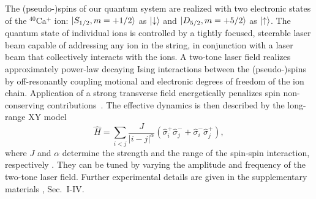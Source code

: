 \documentclass[aps,10pt,reprint,groupedaddress,superscriptaddress]{revtex4-2}
\begin{document}
The (pseudo-)spins of our quantum system are realized with two electronic states of the $^{40}$Ca$^+$ ion: $\ket{S_{1/2},m=+1/2}$ as $\ket{\downarrow}$ and  $\ket{D_{5/2},m=+5/2}$ as $\ket{\uparrow}$. The quantum state of individual ions is controlled by a tightly focused, steerable laser beam capable of addressing any ion in the string, in conjunction with a laser beam that collectively interacts with the ions.
A two-tone laser field realizes approximately power-law decaying Ising interactions between the (pseudo-)spins by off-resonantly coupling motional and electronic degrees of freedom of the ion chain.
Application of a strong transverse field energetically penalizes spin non-conserving contributions~\cite{jurcevic_quasiparticle_2014}. The effective dynamics is then described by the long-range XY model
\begin{equation}
    \hat H= \sum_{i<j} \frac{J}{|i-j|^\alpha} (\hat \sigma^+_i\hat\sigma^-_j + \hat \sigma^-_i\hat\sigma^+_j),
    \label{eq:xy}
\end{equation}
where $J$ and $\alpha$ determine the strength and the range of the spin-spin interaction, respectively \cite{Monroe:2021}. They can be tuned by varying the amplitude and frequency of the two-tone laser field. Further experimental details are given in the supplementary materials \cite{SI}, Sec.~I-IV. 
\end{document}
